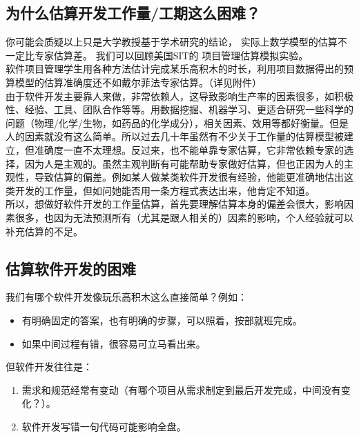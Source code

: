 \hypertarget{ux4e3aux4ec0ux4e48ux4f30ux7b97ux5f00ux53d1ux5de5ux4f5cux91cfux5de5ux671fux8fd9ux4e48ux56f0ux96be}{%
\subsection{为什么估算开发工作量/工期这么困难？}\label{ux4e3aux4ec0ux4e48ux4f30ux7b97ux5f00ux53d1ux5de5ux4f5cux91cfux5de5ux671fux8fd9ux4e48ux56f0ux96be}}

你可能会质疑以上只是大学教授基于学术研究的结论，
实际上数学模型的估算不一定比专家估算差。 我们可以回顾美国SIT的
项目管理估算模拟实验。\\
软件项目管理学生用各种方法估计完成某乐高积木的时长，利用项目数据得出的预算模型的估算准确度还不如戴尔菲法专家估算。（详见附件）\\
由于软件开发主要靠人来做，非常依赖人，这导致影响生产率的因素很多，如积极性、经验、工具、团队合作等等。用数据挖掘、机器学习、更适合研究一些科学的问题（物理/化学/生物，如药品的化学成分），相关因素、效用等都好衡量。但是人的因素就没有这么简单。所以过去几十年虽然有不少关于工作量的估算模型被建立，但准确度一直不太理想。反过来，也不能单靠专家估算，它非常依赖专家的选择，因为人是主观的。虽然主观判断有可能帮助专家做好估算，但也正因为人的主观性，导致估算的偏差。例如某人做某类软件开发很有经验，他能更准确地估出这类开发的工作量，但如问她能否用一条方程式表达出来，他肯定不知道。\\
所以，想做好软件开发的工作量估算，首先要理解估算本身的偏差会很大，影响因素很多，也因为无法预测所有（尤其是跟人相关的）因素的影响，个人经验就可以补充估算的不足。\\

\hypertarget{ux4f30ux7b97ux8f6fux4ef6ux5f00ux53d1ux7684ux56f0ux96be}{%
\subsection{估算软件开发的困难}\label{ux4f30ux7b97ux8f6fux4ef6ux5f00ux53d1ux7684ux56f0ux96be}}

我们有哪个软件开发像玩乐高积木这么直接简单？例如：

\begin{itemize}
\tightlist
\item
  有明确固定的答案，也有明确的步骤，可以照着，按部就班完成。
\item
  如果中间过程有错，很容易可立马看出来。
\end{itemize}

但软件开发往往是：

\begin{enumerate}
\tightlist
\item
  需求和规范经常有变动（有哪个项目从需求制定到最后开发完成，中间没有变化？）。
\item
  软件开发写错一句代码可能影响全盘。
\end{enumerate}

